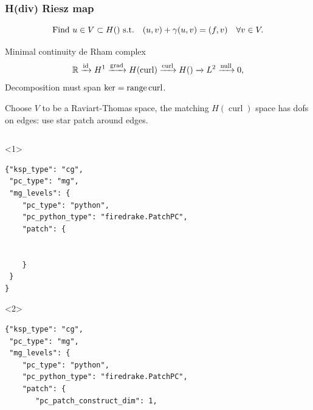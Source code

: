 \documentclass[presentation,aspectratio=43,10pt]{beamer}
\DeclareMathOperator{\grad}{grad}
\let\div\relax
\DeclareMathOperator{\div}{div}
\DeclareMathOperator{\curl}{curl}
\DeclareMathOperator{\range}{range}
\begin{document}
\begin{frame}[fragile]
  \frametitle{H(div) Riesz map}
  \vspace{-1.5\baselineskip}
  \begin{equation*}
    \text{Find $u \in V \subset H(\div)$ s.t.}\quad (u, v) + \gamma (\div u, \div v) = (f, v) \quad \forall v \in V.
  \end{equation*}
  \vspace*{-\baselineskip}
  \begin{block}{Minimal continuity de Rham complex}
    \begin{equation*}
      \mathbb{R} \xrightarrow{\operatorname{id}} H^1 \xrightarrow{\grad} H(\curl)
      \xrightarrow{\curl} H(\div) \xrightarrow{\div} L^2 \xrightarrow{\operatorname{null}} 0,
    \end{equation*}
    Decomposition must span $\ker \div = \range \curl$.

    Choose $V$ to be a Raviart-Thomas space, the matching $H(\curl)$
    space has dofs on edges: use star patch around edges.
  \end{block}
  \begin{columns}
    \begin{column}{0.6\textwidth}
      \begin{onlyenv}<1>
\begin{verbatim}
{"ksp_type": "cg",
 "pc_type": "mg",
 "mg_levels": {
    "pc_type": "python",
    "pc_python_type": "firedrake.PatchPC",
    "patch": {


    }
 }
}
\end{verbatim}
      \end{onlyenv}
      \begin{onlyenv}<2>
\begin{verbatim}
{"ksp_type": "cg",
 "pc_type": "mg",
 "mg_levels": {
    "pc_type": "python",
    "pc_python_type": "firedrake.PatchPC",
    "patch": {
       "pc_patch_construct_dim": 1,


\end{verbatim}
\end{onlyenv}
\end{column}
\end{columns}
\end{frame}
\end{document}
